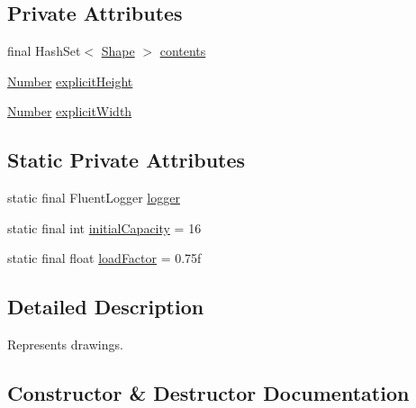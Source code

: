 \subsection*{Private Attributes}
\begin{DoxyCompactItemize}
\item 
final Hash\+Set$<$ \hyperlink{classcom_1_1aarrelaakso_1_1drawl_1_1_shape}{Shape} $>$ \hyperlink{classcom_1_1aarrelaakso_1_1drawl_1_1_drawing_ab9ec6030e9f21d42852b308c482b3ccf}{contents}
\item 
\hyperlink{interfacecom_1_1aarrelaakso_1_1drawl_1_1_number}{Number} \hyperlink{classcom_1_1aarrelaakso_1_1drawl_1_1_drawing_af4ab83c7d30a2f1d1d54f247c78e3b51}{explicit\+Height}
\item 
\hyperlink{interfacecom_1_1aarrelaakso_1_1drawl_1_1_number}{Number} \hyperlink{classcom_1_1aarrelaakso_1_1drawl_1_1_drawing_a4ae6b33e0ae3b4a615e06bed22db02d7}{explicit\+Width}
\end{DoxyCompactItemize}
\subsection*{Static Private Attributes}
\begin{DoxyCompactItemize}
\item 
static final Fluent\+Logger \hyperlink{classcom_1_1aarrelaakso_1_1drawl_1_1_drawing_a9ca07608ceeb04d747e114cd1a82a3f9}{logger}
\item 
static final int \hyperlink{classcom_1_1aarrelaakso_1_1drawl_1_1_drawing_a151c12e3dc5c72fe0f1e3186de42db70}{initial\+Capacity} = 16
\item 
static final float \hyperlink{classcom_1_1aarrelaakso_1_1drawl_1_1_drawing_a853a2ba75750f3ece0036c3617ac169f}{load\+Factor} = 0.\+75f
\end{DoxyCompactItemize}


\subsection{Detailed Description}
Represents drawings. 

\subsection{Constructor \& Destructor Documentation}
\mbox{\label{classcom_1_1aarrelaakso_1_1drawl_1_1_drawing_adc398fbdb9acaa2c09ab8f048ff45109}} 
